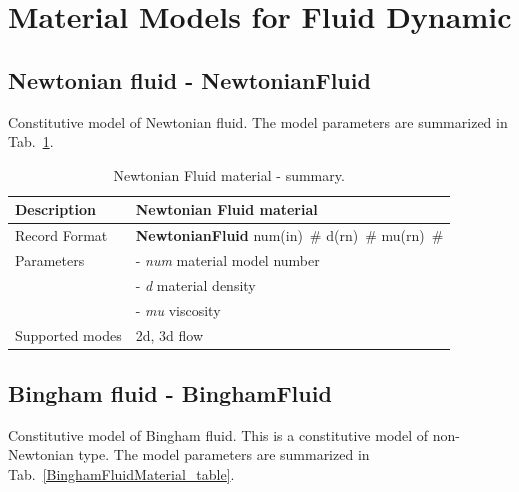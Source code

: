 \documentclass[a4paper]{article}
\newcommand{\descitem}[1]{{\noindent \bf #1}}
\newcommand{\elemparam}[2]{{{#1\tiny (#2)}~\#}}
\newcommand{\param}[1]{{\it #1}}
\begin{document}
\clearpage

\section{Material Models for Fluid Dynamic}
\subsection{Newtonian fluid - NewtonianFluid}
\label{NewtonianFluidMaterial}
Constitutive model of Newtonian fluid. The model parameters are summarized
in Tab.~\ref{NewtonianFluidMaterial_table}.

\begin{table}[!htb]
\begin{tabular}{|l|p{9cm}|}
\hline
Description & Newtonian Fluid material\\
\hline
Record Format & \descitem{NewtonianFluid} \elemparam{num}{in}
\elemparam{d}{rn} \elemparam{mu}{rn}\\
Parameters &- \param{num} material model number\\
&- \param{d} material density\\
&- \param{mu} viscosity\\
Supported modes& 2d, 3d flow\\
\hline
\end{tabular}
\caption{Newtonian Fluid material - summary.}
\label{NewtonianFluidMaterial_table}
\end{table}



\subsection{Bingham fluid - BinghamFluid}
\label{BinghamFluidMaterial}
Constitutive model of Bingham fluid. This is a constitutive model of
non-Newtonian type. The model parameters are summarized
in Tab.~\ref{BinghamFluidMaterial_table}.
\end{document}
